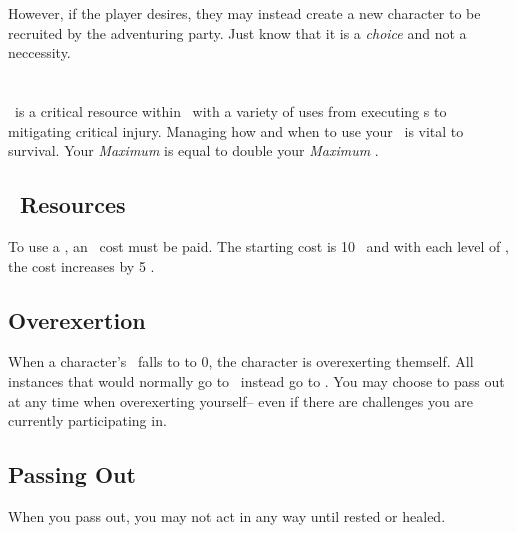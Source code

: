 However, if the player desires, they may instead create a new character
to be recruited by the adventuring party. Just know that it is a \emph{choice}
and not a neccessity.

\section{\ENful\index{\ENful}}\label{sec:energy}

\ENful\ is a critical resource within \gametitlemini\ with a variety of uses from executing \techn s to mitigating critical injury.
Managing how and when to use your \ENful\ is vital to survival. Your \emph{Maximum \ENful} is equal to double your \emph{Maximum \HPful}.

\subsection{\techn\ Resources}\index{\techn}\label{subsec:tech_resources}

To use a \techn{}, an \ENful\ cost must
be paid. The starting cost is 10 \EN\ and with each level of \advancement{}\index{\advancement},
the cost increases by 5 \EN.

\subsection{Overexertion}\label{subsec:exhaustion}

When a character's \ENful\ falls to to 0, the character is overexerting themself. All instances that would normally go to \ENful\ instead go to \HPful . You may choose to pass out at any time when overexerting yourself-- even if there are challenges you are currently participating in.

\subsection{Passing Out}\label{subsec:pass_out}
When you pass out, you may not act in any way until rested or healed.

